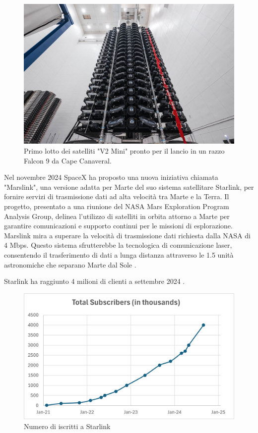 \begin{figure}[htbp]
  \centering
  \includegraphics[width=0.8\linewidth]{./res/img/satellite_v2mini.jpg}
  \caption{Primo lotto dei satelliti "V2 Mini" pronto per il lancio in un razzo Falcon 9 da Cape Canaveral.}
  \label{fig:satellite_v2mini}
\end{figure}

Nel novembre 2024 SpaceX ha proposto una nuova iniziativa chiamata "Marslink", una versione adatta per Marte del suo sistema satellitare Starlink, per fornire servizi di trasmissione dati ad alta velocità tra Marte e la Terra. 
Il progetto, presentato a una riunione del NASA Mars Exploration Program Analysis Group, delinea l'utilizzo di satelliti in orbita attorno a Marte per garantire comunicazioni e supporto continui per le missioni di esplorazione.
Marslink mira a superare la velocità di trasmissione dati richiesta dalla NASA di 4 Mbps.
Questo sistema sfrutterebbe la tecnologica di comunicazione laser, consentendo il trasferimento di dati a lunga distanza attraverso le 1.5 unità astronomiche che separano Marte dal Sole \cite{michael_kan_spacex_2024}.

Starlink ha raggiunto 4 milioni di clienti a settembre 2024 \cite{starlink_starlink_nodate}.

\begin{figure}[htbp]
  \centering
  \includegraphics[width=0.8\linewidth]{./res/img/chart_subs.png}
  \caption{Numero di iscritti a Starlink}
  \label{fig:chart-subs}
\end{figure}

